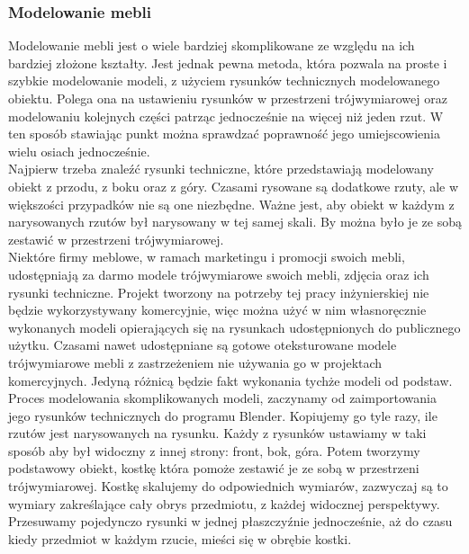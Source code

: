 \documentclass{article} %
\begin{document}
            
        \subsubsection{Modelowanie mebli}
            Modelowanie mebli jest o wiele bardziej skomplikowane ze względu na ich bardziej złożone kształty. Jest jednak pewna metoda, która pozwala na proste i szybkie modelowanie modeli, z użyciem rysunków technicznych modelowanego obiektu. Polega ona na ustawieniu rysunków w przestrzeni trójwymiarowej oraz modelowaniu kolejnych części patrząc jednocześnie na więcej niż jeden rzut. W ten sposób stawiając punkt można sprawdzać poprawność jego umiejscowienia wielu osiach jednocześnie.
            \\
            
            Najpierw trzeba znaleźć rysunki techniczne, które przedstawiają modelowany obiekt z przodu, z boku oraz z góry. Czasami rysowane są dodatkowe rzuty, ale w większości przypadków nie są one niezbędne. Ważne jest, aby obiekt w każdym z narysowanych rzutów był narysowany w tej samej skali. By można było je ze sobą zestawić w przestrzeni trójwymiarowej.
            \\
            
            Niektóre firmy meblowe, w ramach marketingu i promocji swoich mebli, udostępniają za darmo modele trójwymiarowe swoich mebli, zdjęcia oraz ich rysunki techniczne. Projekt tworzony na potrzeby tej pracy inżynierskiej nie będzie wykorzystywany komercyjnie, więc można użyć w nim własnoręcznie wykonanych modeli opierających się na rysunkach udostępnionych do publicznego użytku. Czasami nawet udostępniane są gotowe oteksturowane modele trójwymiarowe mebli z zastrzeżeniem nie używania  go w projektach komercyjnych. Jedyną różnicą będzie fakt wykonania tychże modeli od podstaw.
            \\
            
            Proces modelowania skomplikowanych modeli, zaczynamy od zaimportowania jego rysunków technicznych do programu Blender. Kopiujemy go tyle razy, ile rzutów jest narysowanych na rysunku. Każdy z rysunków ustawiamy w taki sposób aby był widoczny z innej strony: front, bok, góra. Potem tworzymy podstawowy obiekt, kostkę która pomoże zestawić je ze sobą w przestrzeni trójwymiarowej. Kostkę skalujemy do odpowiednich wymiarów, zazwyczaj są to wymiary zakreślające cały obrys przedmiotu, z każdej widocznej perspektywy. Przesuwamy pojedynczo rysunki w jednej płaszczyźnie jednocześnie, aż do czasu kiedy przedmiot w każdym rzucie, mieści się w obrębie kostki.
            \\
            
\end{document}
